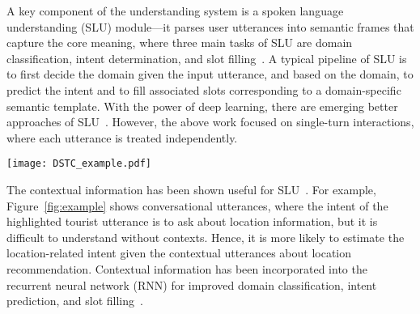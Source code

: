 \documentclass{article}
\begin{document}
A key component of the understanding system is a spoken language understanding (SLU) module---it parses user utterances into semantic frames that capture the core meaning, where three main tasks of SLU are domain classification, intent determination, and slot filling~\cite{tur2011spoken}.
A typical pipeline of SLU is to first decide the domain given the input utterance, and based on the domain, to predict the intent and to fill associated slots corresponding to a domain-specific semantic template.
With the power of deep learning, there are emerging better approaches of SLU~\cite{hakkani2016multi,chen2016knowledge,chen2016syntax,wang2016learning}.
However, the above work focused on single-turn interactions, where each utterance is treated independently.

\begin{figure*}[t]
\centering
\texttt{[image: DSTC\_example.pdf]}
\caption{The human-human conversational utterances and their associated semantic labels from DSTC4.}
\label{fig:example}
\end{figure*}

The contextual information has been shown useful for SLU~\cite{bhargava2013easy,xu2014contextual,chen2015leveraging,sun2016an}.
For example, Figure~\ref{fig:example} shows conversational utterances, where the intent of the highlighted tourist utterance is to ask about location information, but it is difficult to understand without contexts.
Hence, it is more likely to estimate the location-related intent given the contextual utterances about location recommendation.
Contextual information has been incorporated into the recurrent neural network (RNN) for improved domain classification, intent prediction, and slot filling~\cite{xu2014contextual,shi2015contextual,weston2015memory,chen2016end}.

\end{document}
